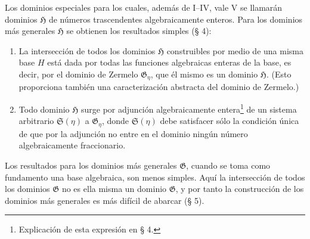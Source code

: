 Los dominios especiales para los cuales, además de I--IV, vale V se llamarán dominios $\mathfrak H$ de números trascendentes algebraicamente enteros. Para los dominios más generales $\mathfrak H$ se obtienen los resultados simples (§ 4):
\begin{enumerate}
\item[a)] La intersección de todos los dominios $\mathfrak H$ construibles por medio de una misma base $H$ está dada por todas las funciones algebraicas enteras de la base, es decir, por el dominio de Zermelo $\mathfrak G_\eta$, que él mismo es un dominio $\mathfrak H$. (Esto proporciona también una caracterización abstracta del dominio de Zermelo.)
\item[b)] Todo dominio $\mathfrak H$ surge por adjunción algebraicamente entera\footnote{Explicación de esta expresión en § 4.} de un sistema arbitrario $\mathfrak S(\eta)$ a $\mathfrak G_\eta$, donde $\mathfrak S(\eta)$ debe satisfacer sólo la condición única de que por la adjunción no entre en el dominio ningún número algebraicamente fraccionario.
\end{enumerate}

Los resultados para los dominios más generales $\mathfrak G$, cuando se toma como fundamento una base algebraica, son menos simples. Aquí la intersección de todos los dominios $\mathfrak G$ no es ella misma un dominio $\mathfrak G$, y por tanto la construcción de los dominios más generales es más difícil de abarcar (§ 5).

